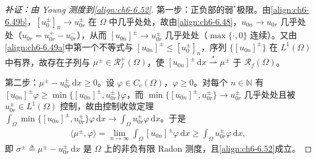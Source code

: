 \documentclass[../../main.tex]{subfiles}%
\begin{document}
\begin{proof}[补证：由 Young 测度到\eqref{align:ch6-6.52}]
第一步：正负部的弱$^*$极限。由\eqref{align:ch6-6.49b}，$[u^\pm_0]_n\to u^\pm_{0r}$ 在 $\Omega$ 中几乎处处，故由\eqref{align:ch6-6.48}，$u_{0n}\to u_{0r}$ 几乎处处（$u_{0r}=u^+_{0r}-u^-_{0r}$），从而 $[u_{0n}]^\pm\to u^\pm_{0r}$ 几乎处处（$\max\{\cdot,0\}$ 连续）。又由\eqref{align:ch6-6.49a}中第一个不等式与 $[u_{0n}]^\pm\leqslant[u^\pm_0]_n$，序列 $\{[u_{0n}]^\pm\}$ 在 $L^1(\Omega)$ 中有界，故存在子列与 $\mu^\pm\in\mathscr{R}^+_f(\Omega)$，使 $[u_{0n}]^\pm\,\mathrm{d}x\stackrel{*}{\rightharpoonup}\mu^\pm$ 于 $\mathscr{R}_f(\Omega)$。

第二步：$\mu^\pm-u^\pm_{0r}\,\mathrm{d}x\geqslant0$。设 $\varphi\in C_c(\Omega)$，$\varphi\geqslant0$。对每个 $n\in\mathbb{N}$ 有 $[u_{0n}]^\pm\varphi\geqslant\min\{[u_{0n}]^\pm,u^\pm_{0r}\}\varphi$，而 $\min\{[u_{0n}]^\pm,u^\pm_{0r}\}\to u^\pm_{0r}$ 几乎处处且被 $u^\pm_{0r}\in L^1(\Omega)$ 控制，故由控制收敛定理 $\int_\Omega\min\{[u_{0n}]^\pm,u^\pm_{0r}\}\varphi\,\mathrm{d}x\to\int_\Omega u^\pm_{0r}\varphi\,\mathrm{d}x$。于是
\begin{align*}
\langle\mu^\pm,\varphi\rangle=\lim_{n\to\infty}\int_\Omega[u_{0n}]^\pm\varphi\,\mathrm{d}x
\geqslant\int_\Omega u^\pm_{0r}\varphi\,\mathrm{d}x,
\end{align*}
即 $\sigma^\pm\triangleq\mu^\pm-u^\pm_{0r}\,\mathrm{d}x$ 是 $\Omega$ 上的非负有限 Radon 测度，且\eqref{align:ch6-6.52}成立。


\end{proof}
\end{document}
